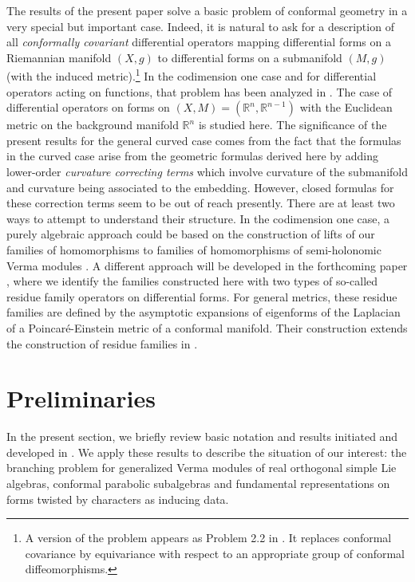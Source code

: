 \documentclass[a4paper,12pt,reqno]{amsart}
\numberwithin{theorem}{subsection}
\numberwithin{equation}{section}
\begin{document}
The results of the present paper solve a basic problem of conformal geometry in
a very special but important case. Indeed, it is natural to ask for a
description of all {\em conformally covariant} differential operators mapping
differential forms on a Riemannian manifold $(X,g)$ to differential forms on a
submanifold $(M,g)$ (with the induced metric).\footnote{A version of the
problem appears as Problem 2.2 in \cite{KKP}. It replaces conformal covariance
by equivariance with respect to an appropriate group of conformal
diffeomorphisms.} In the codimension one case and for differential operators
acting on functions, that problem has been analyzed in \cite{Juhl}. The case of
differential operators on forms on $(X,M) = ({\mathbb{R}}^n,{\mathbb{R}}^{n-1})$ with the Euclidean
metric on the background manifold ${\mathbb{R}}^n$ is studied here. The significance of
the present results for the general curved case comes from the fact that the
formulas in the curved case arise from the geometric formulas derived here by
adding lower-order {\em curvature correcting terms} which involve curvature of
the submanifold and curvature being associated to the embedding. However,
closed formulas for these correction terms seem to be out of reach presently.
There are at least two ways to attempt to understand their structure. In the
codimension one case, a purely algebraic approach could be based on the
construction of lifts of our families of homomorphisms to families of
homomorphisms of semi-holonomic Verma modules \cite{eastwoodslovak}. A
different approach will be developed in the forthcoming paper \cite{fjs}, where
we identify the families constructed here with two types of so-called residue
family operators on differential forms. For general metrics, these residue
families are defined by the asymptotic expansions of eigenforms of the
Laplacian of a Poincar\'e-Einstein metric of a conformal manifold. Their
construction extends the construction of residue families in \cite{Juhl}.

\section{Preliminaries}\label{FMethod}

In the present section, we briefly review basic notation and results initiated
and developed in \cite{ko, Kobayashi-Pevzner, koss, kob}. We apply these
results to describe the situation of our interest: the branching problem for
generalized Verma modules of real orthogonal simple Lie algebras, conformal
parabolic subalgebras and fundamental representations on forms twisted by
characters as inducing data.
\end{document}

